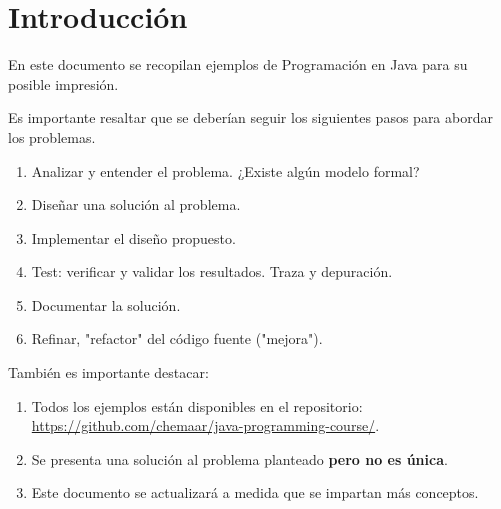 \chapter{Introducción}
En este documento se recopilan ejemplos de Programación en Java para su posible impresión.

Es importante resaltar que se deberían seguir los siguientes pasos para abordar los problemas.

\begin{enumerate}
 \item Analizar y entender el problema. ¿Existe algún modelo formal?
 \item Diseñar una solución al problema.
 \item Implementar el diseño propuesto.
 \item Test: verificar y validar los resultados. Traza y depuración.
 \item Documentar la solución.
 \item Refinar, "refactor" del código fuente ("mejora").
\end{enumerate}

También es importante destacar: 

\begin{enumerate}
	\item Todos los ejemplos están disponibles en el repositorio: \url{https://github.com/chemaar/java-programming-course/}.
	\item Se presenta una solución al problema planteado \textbf{pero no es única}.
	\item Este documento se actualizará a medida que se impartan más conceptos.
\end{enumerate}